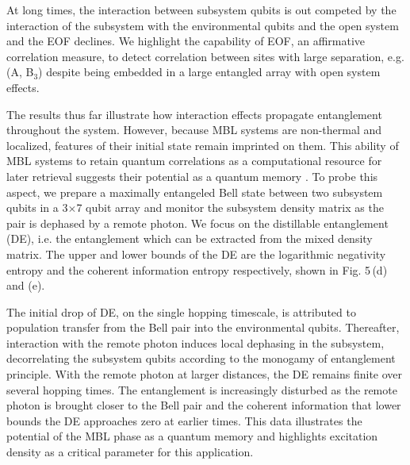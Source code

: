 At long times, the interaction between subsystem qubits is out competed by the interaction of the subsystem with the environmental qubits and the open system and the EOF declines.  We highlight the capability of EOF, an affirmative correlation measure, to detect correlation between sites with large separation, e.g. (A, B$_3$) despite being embedded in a large entangled array with open system effects.


The results thus far illustrate how interaction effects propagate entanglement throughout the system.  However, because MBL systems are non-thermal and localized, features of their initial state remain imprinted on them.  This ability of MBL systems to retain quantum correlations as a computational resource for later retrieval suggests their potential as a quantum memory \cite{Huse2014, Moore2015, Cirac2017}.  To probe this aspect, we prepare a maximally entangeled Bell state between two subsystem qubits in a 3$\times$7 qubit array and monitor the subsystem density matrix as the pair is dephased by a remote photon. %
We focus on the distillable entanglement (DE), i.e. the entanglement which can be extracted from the mixed density matrix.  The upper and lower bounds of the DE are the logarithmic negativity entropy and the coherent information entropy respectively, shown in Fig. 5\,(d) and (e).

The initial drop of DE, on the single hopping timescale, is attributed to population transfer from the Bell pair into the environmental qubits. Thereafter, interaction with the remote photon induces local dephasing in the subsystem, decorrelating the subsystem qubits according to the monogamy of entanglement principle.  With the remote photon at larger distances, the DE remains finite over several hopping times.  The entanglement is increasingly disturbed as the remote photon is brought closer to the Bell pair and the coherent information that lower bounds the DE approaches zero at earlier times.  This data illustrates the potential of the MBL phase as a quantum memory and highlights excitation density as a critical parameter for this application.

\vspace{1em}

